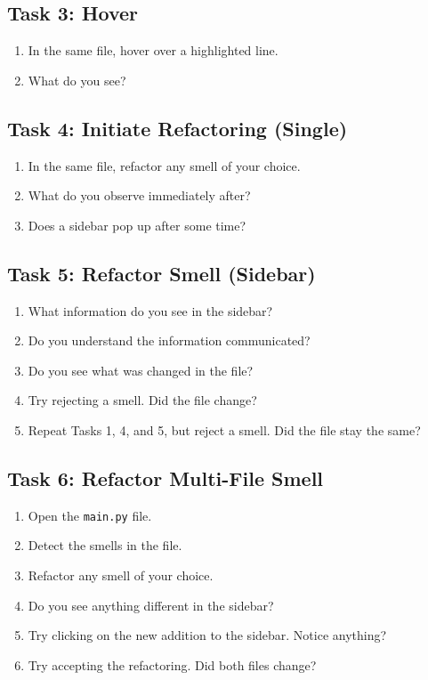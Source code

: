 \documentclass[12pt, titlepage]{article}
\begin{document}
\subsection*{Task 3: Hover}
\begin{enumerate}
  \item In the same file, hover over a highlighted line.
  \item What do you see?
\end{enumerate}

\subsection*{Task 4: Initiate Refactoring (Single)}
\begin{enumerate}
  \item In the same file, refactor any smell of your choice.
  \item What do you observe immediately after?
  \item Does a sidebar pop up after some time?
\end{enumerate}

\subsection*{Task 5: Refactor Smell (Sidebar)}
\begin{enumerate}
  \item What information do you see in the sidebar?
  \item Do you understand the information communicated?
  \item Do you see what was changed in the file?
  \item Try rejecting a smell. Did the file change?
  \item Repeat Tasks 1, 4, and 5, but reject a smell. Did the file
    stay the same?
\end{enumerate}

\subsection*{Task 6: Refactor Multi-File Smell}
\begin{enumerate}
  \item Open the \texttt{main.py} file.
  \item Detect the smells in the file.
  \item Refactor any smell of your choice.
  \item Do you see anything different in the sidebar?
  \item Try clicking on the new addition to the sidebar. Notice anything?
  \item Try accepting the refactoring. Did both files change?
\end{enumerate}
\end{document}
